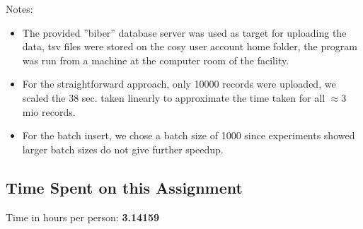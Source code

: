 \documentclass[11pt]{scrartcl}
\begin{document}
  \bigskip

  \noindent Notes:
  \begin{itemize}
  \item The provided ''biber'' database server was used as target for
  uploading the data, tsv files were stored on the cosy user account home folder,
  the program was run from a machine at the computer room of the facility.
  
  \item For the straightforward approach, only 10000 records were uploaded,
  we scaled the 38 sec. taken linearly to approximate the time taken for all $\approx 3$ mio records.
  
  \item For the batch insert, we chose a batch size of 1000 since experiments showed
  larger batch sizes do not give further speedup.
\end{itemize}

  \subsection*{Time Spent on this Assignment}

  Time in hours per person: {\bf 3.14159}
\end{document}
